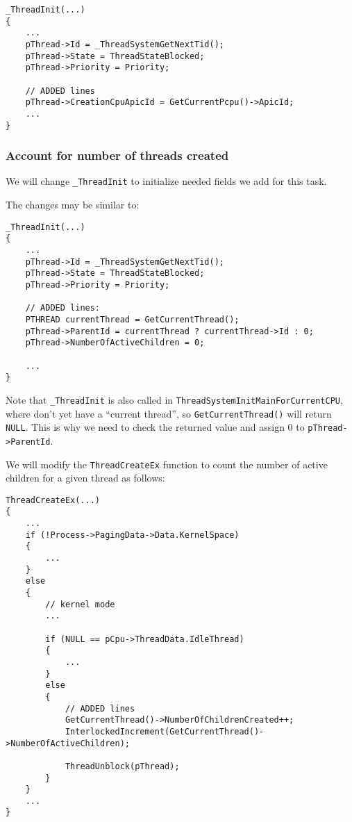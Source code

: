 \begin{lstlisting}
_ThreadInit(...)
{
    ...
    pThread->Id = _ThreadSystemGetNextTid();
    pThread->State = ThreadStateBlocked;
    pThread->Priority = Priority;

    // ADDED lines
    pThread->CreationCpuApicId = GetCurrentPcpu()->ApicId;
    ...
}
\end{lstlisting}


\subsubsection{Account for number of threads created}

We will change \lstinline|_ThreadInit| to initialize needed fields we add for this task.

The changes may be similar to: 
\begin{lstlisting}
_ThreadInit(...)
{
    ...
    pThread->Id = _ThreadSystemGetNextTid();
    pThread->State = ThreadStateBlocked;
    pThread->Priority = Priority;

    // ADDED lines:
    PTHREAD currentThread = GetCurrentThread();
    pThread->ParentId = currentThread ? currentThread->Id : 0;
    pThread->NumberOfActiveChildren = 0;

    ...
}
\end{lstlisting}

Note that \lstinline|_ThreadInit| is also called in \lstinline|ThreadSystemInitMainForCurrentCPU|, where don't yet have
a ``current thread'', so \lstinline|GetCurrentThread()| will return \lstinline|NULL|. This is why we need to check the returned value
and assign 0 to \lstinline|pThread->ParentId|.

We will modify the \lstinline|ThreadCreateEx| function to count the number of active children for a given thread as follows:
\begin{lstlisting}
ThreadCreateEx(...)
{
    ... 
    if (!Process->PagingData->Data.KernelSpace)
    {
        ...
    }
    else 
    {
        // kernel mode
        ...
        
        if (NULL == pCpu->ThreadData.IdleThread)
        {
            ...
        }
        else
        {
            // ADDED lines
            GetCurrentThread()->NumberOfChildrenCreated++; 
            InterlockedIncrement(GetCurrentThread()->NumberOfActiveChildren); 
            
            ThreadUnblock(pThread);
        }
    }
    ...
}
\end{lstlisting}

